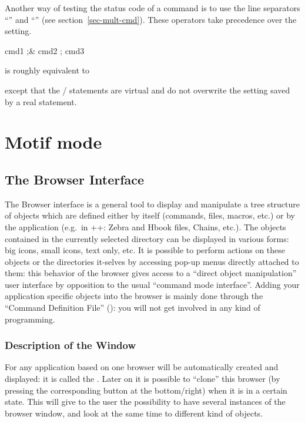 Another way of testing the status code of a command is to use the line
separators ``\Lit{;&}'' and ``\Lit{;!}'' (see
section~\ref{sec-mult-cmd}).
These operators take precedence over the  setting.
\begin{XMP}
cmd1 ;& cmd2 ; cmd3
\end{XMP}
is roughly equivalent to
except that the / statements are virtual and
do not overwrite the setting saved by a real  statement.


\section{Motif mode}

\subsection{The \KUIPMotif{} Browser Interface}
\label{ref:rebrowser}

The \KUIPMotif{} Browser interface is a general tool to display and
manipulate a tree structure of objects which are defined either
by \KUIP{} itself (commands, files, macros, etc.) or by the
application (e.g.\ in \PAW++{}: Zebra and Hbook files, Chains, etc.).
The objects contained in the currently selected directory can be
displayed in various forms: big icons, small icons, text only, etc.
It is possible to perform actions on these objects or the directories 
it-selves by accessing pop-up menus directly attached to them: this 
behavior of the browser gives access to a ``direct object manipulation'' 
user interface by opposition to the usual ``command mode interface''.
Adding your application specific objects into the browser is mainly
done through the \KUIP{} ``Command Definition File'' (\CDF{}): you will 
not get involved in any kind of \Motif{} programming.

\subsubsection{Description of the \MB{} Window}
\label{ref:rebrom}

For any application based on \KUIPMotif{} one browser will be automatically
created and displayed: it is called the \MB{}. Later on it is 
possible to ``clone'' this browser (by pressing the corresponding button at 
the bottom/right) when it is in a certain state. This will give to the user
the possibility to have several instances of the browser window, and look 
at the same time to different kind of objects.


